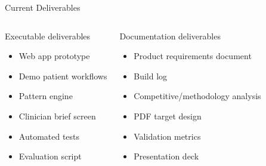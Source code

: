 \documentclass[aspectratio=169,11pt]{beamer}
\begin{document}
\begin{frame}{Current Deliverables}
  \begin{columns}[T]
      \begin{block}{Executable deliverables}
        \begin{itemize}
          \item Web app prototype
          \item Demo patient workflows
          \item Pattern engine
          \item Clinician brief screen
          \item Automated tests
          \item Evaluation script
        \end{itemize}
      \end{block}
      \begin{block}{Documentation deliverables}
        \begin{itemize}
          \item Product requirements document
          \item Build log
          \item Competitive/methodology analysis
          \item PDF target design
          \item Validation metrics
          \item Presentation deck
        \end{itemize}
      \end{block}
  \end{columns}
\end{frame}
\end{document}
